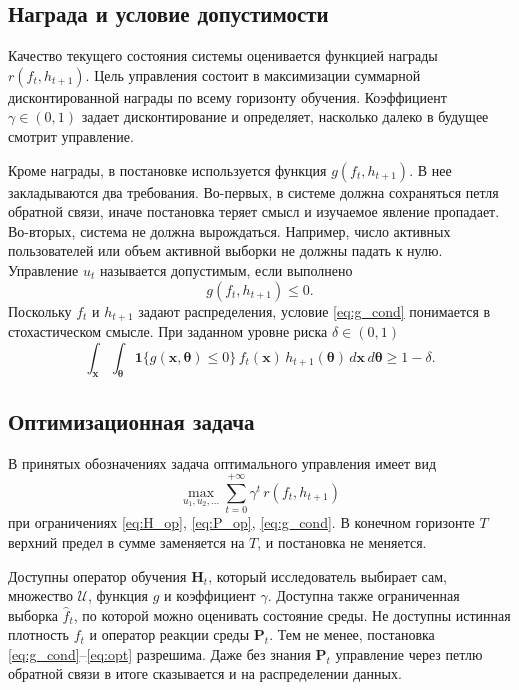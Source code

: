 \documentclass[a4paper,14pt,oneside,openany]{extarticle}
\newcommand{\bH}{\mathbf{H}}
\newcommand{\bP}{\mathbf{P}}
\newcommand{\bx}{\mathbf{x}}
\newcommand{\cU}{\mathcal{U}}
\newcommand{\btheta}{\boldsymbol{\theta}}
\begin{document}
\subsection{Награда и условие допустимости}

Качество текущего состояния системы оценивается функцией награды $r(f_t, h_{t+1})$. Цель управления состоит в максимизации суммарной дисконтированной награды по всему горизонту обучения. Коэффициент $\gamma \in (0, 1)$ задает дисконтирование и определяет, насколько далеко в будущее смотрит управление.

Кроме награды, в постановке используется функция $g(f_t, h_{t+1})$. В нее закладываются два требования. Во-первых, в системе должна сохраняться петля обратной связи, иначе постановка теряет смысл и изучаемое явление пропадает. Во-вторых, система не должна вырождаться. Например, число активных пользователей или объем активной выборки не должны падать к нулю. Управление $u_t$ называется допустимым, если выполнено
\begin{equation}
    g(f_t, h_{t+1}) \le 0. \label{eq:g_cond}
\end{equation}
Поскольку $f_t$ и $h_{t+1}$ задают распределения, условие \eqref{eq:g_cond} понимается в стохастическом смысле. При заданном уровне риска $\delta \in (0, 1)$
\begin{equation}
    \int_{\bx}\int_{\btheta} \mathbf{1}\{g(\bx, \btheta) \le 0\}\, f_t(\bx)\, h_{t+1}(\btheta)\, d\bx\, d\btheta \ge 1 - \delta. \label{eq:g_stoch}
\end{equation}

\subsection{Оптимизационная задача}

В принятых обозначениях задача оптимального управления имеет вид
\begin{equation}
    \max_{u_1, u_2, \ldots} \sum_{t=0}^{+\infty} \gamma^t\, r(f_t, h_{t+1}) \label{eq:opt}
\end{equation}
при ограничениях \eqref{eq:H_op}, \eqref{eq:P_op}, \eqref{eq:g_cond}. В конечном горизонте $T$ верхний предел в сумме заменяется на $T$, и постановка не меняется.

Доступны оператор обучения $\bH_t$, который исследователь выбирает сам, множество $\cU$, функция $g$ и коэффициент $\gamma$. Доступна также ограниченная выборка $\hat f_t$, по которой можно оценивать состояние среды. Не доступны истинная плотность $f_t$ и оператор реакции среды $\bP_t$. Тем не менее, постановка \eqref{eq:g_cond}--\eqref{eq:opt} разрешима. Даже без знания $\bP_t$ управление через петлю обратной связи в итоге сказывается и на распределении данных.
\end{document}
